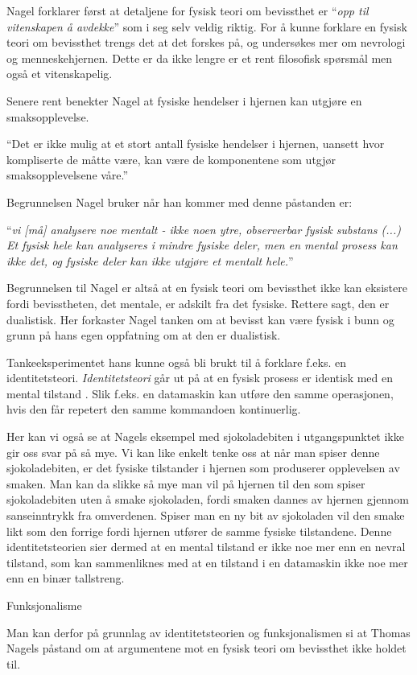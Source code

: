 Nagel forklarer først at detaljene for fysisk teori om bevissthet er ``\emph{opp til vitenskapen å avdekke}'' som i seg selv veldig riktig.
For å kunne forklare en fysisk teori om bevissthet trengs det at det forskes på,
og undersøkes mer om nevrologi og menneskehjernen. Dette er da ikke lengre er et rent filosofisk spørsmål men også et vitenskapelig.

Senere rent benekter Nagel at fysiske hendelser i hjernen kan utgjøre en smaksopplevelse.
\begin{pquotation}{\cite[36]{Nagel2003}}
    ``Det er ikke mulig at et stort antall fysiske hendelser i hjernen,
uansett hvor kompliserte de måtte være, 
kan være de komponentene som utgjør smaksopplevelsene våre.''
\end{pquotation}
Begrunnelsen Nagel bruker når han kommer med denne påstanden er:
\begin{pquotation}{\cite[36]{Nagel2003}}
``\textit{vi [må] analysere noe mentalt - ikke noen ytre, observerbar fysisk substans (...) 
Et fysisk hele kan analyseres i mindre fysiske deler, men en
mental prosess kan ikke det, og fysiske deler kan ikke utgjøre et mentalt hele.}''
\end{pquotation}
Begrunnelsen til Nagel er altså at en fysisk teori om bevissthet ikke kan eksistere fordi bevisstheten, 
det mentale, er adskilt fra det fysiske. Rettere sagt, den er dualistisk. 
Her forkaster Nagel tanken om at bevisst kan være fysisk i bunn og grunn på hans egen oppfatning om at den er dualistisk.

Tankeeksperimentet hans kunne også bli brukt til å forklare f.eks. en identitetsteori.
\textit{Identitetsteori} går ut på at en fysisk prosess er identisk med en mental tilstand \autocite{snl:identitetsteori}.
Slik f.eks. en datamaskin kan utføre den samme operasjonen,
hvis den får repetert den samme kommandoen kontinuerlig.

Her kan vi også se at Nagels eksempel med sjokoladebiten i utgangspunktet 
ikke gir oss svar på så mye.
Vi kan like enkelt tenke oss at når man spiser denne sjokoladebiten,
er det fysiske tilstander i hjernen som produserer opplevelsen av smaken. 
Man kan da slikke så mye man vil på hjernen til den som spiser sjokoladebiten 
uten å smake sjokoladen, fordi smaken dannes av hjernen gjennom sanseinntrykk fra omverdenen.
Spiser man en ny bit av sjokoladen vil den smake likt som den forrige fordi hjernen 
utfører de samme fysiske tilstandene.
Denne identitetsteorien sier dermed at en mental tilstand er ikke noe mer enn en nevral tilstand,
som kan sammenliknes med at en tilstand i en datamaskin ikke noe mer enn en binær tallstreng.

Funksjonalisme 

Man kan derfor på grunnlag av identitetsteorien og funksjonalismen si at 
Thomas Nagels påstand om at argumentene mot en fysisk teori om bevissthet ikke holdet til.